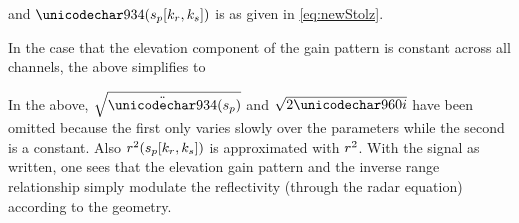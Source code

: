and $\Phi(\stationaryparm[\kr,\kparm])$ is as given in \eqref{eq:newStolz}.
\par
In the case that the elevation component of the gain pattern is constant across all channels, the above simplifies to
\begin{center}
\end{center}
In the above, $\sqrt{\ddot\Phi(\stationaryparm)}$ and $\sqrt{2\pi\im}$ have been omitted because the first only varies slowly over the parameters while the second is a constant. Also $\mathnormal{r}^2(s_p[k_r,k_{s}])$ is approximated with $\mathnormal{r}^2$. With the signal as written, one sees that the elevation gain pattern and the inverse range relationship simply modulate the reflectivity (through the radar equation) according to the geometry.
